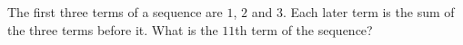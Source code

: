 The first three terms of a sequence are $1$, $2$ and $3$. Each later term is the sum of the three terms before it. What is the $11$th term of the sequence?
